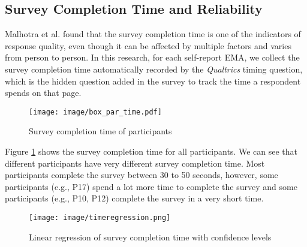 \documentclass[sigconf]{acmart}
\begin{document}
\subsection{Survey Completion Time and Reliability}

Malhotra et al. \cite{malhotra2008completion} found that the survey completion time is one of the indicators of response quality, even though it can be affected by multiple factors and varies from person to person. In this research, for each self-report EMA, we collect the survey completion time automatically recorded by the \textit{Qualtrics} timing question, which is the hidden question added in the survey to track the time a respondent spends on that page. 

\begin{figure}
    \centering
    \texttt{[image: image/box\_par\_time.pdf]}
    \caption{Survey completion time of participants}
    \label{fig:box_time}
\end{figure}

Figure \ref{fig:box_time} shows the survey completion time for all participants. We can see that different participants have very different survey completion time. Most participants complete the survey between 30 to 50 seconds, however, some participants (e.g., P17) spend a lot more time to complete the survey and some participants (e.g., P10, P12) complete the survey in a very short time.



\begin{figure}
    \centering
    \texttt{[image: image/timeregression.png]}
    \caption{Linear regression of survey completion time with confidence levels }
    \label{fig:regression}
\end{figure}
\end{document}
